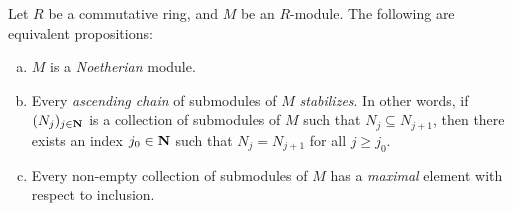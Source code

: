 \begin{proposition}
\label{prop:equiv-conditions-noetherian}
Let \(R\) be a commutative ring, and \(M\) be an \(R\)-module. The following are
equivalent propositions:
\begin{enumerate}[(a)]\setlength\itemsep{0em}
\item \(M\) is a \emph{Noetherian} module.

\item Every \emph{ascending chain} of submodules of \(M\) \emph{stabilizes}. In
  other words, if \((N_j)_{j \in \mathbf{N}}\) is a collection of submodules of \(M\)
  such that \(N_j \subseteq N_{j+1}\), then there exists an index \(j_0 \in \mathbf{N}\)
  such that \(N_j = N_{j+1}\) for all \(j \geq j_0\).

\item Every non-empty collection of submodules of \(M\) has a \emph{maximal}
  element with respect to inclusion.
\end{enumerate}
\end{proposition}

